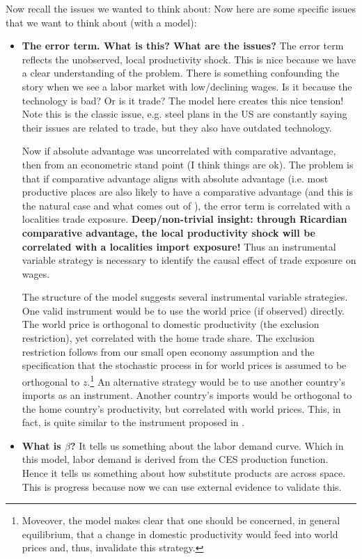 \documentclass[pdftex,12pt]{article}
\begin{document}
\medskip
\noindent Now recall the issues we wanted to think about:
Now here are some specific issues that we want to think about (with a model):
\begin{itemize}
\item \textbf{The error term. What is this? What are the issues?} The error term reflects the unobserved, local productivity shock. This is nice because we have a clear understanding of the problem. There is something confounding the story when we see a labor market with low/declining wages. Is it because the technology is bad? Or is it trade? The model here creates this nice tension! Note this is the classic issue, e.g. steel plans in the US are constantly saying their issues are related to trade, but they also have outdated technology. 
    
    Now if absolute advantage was uncorrelated with comparative advantage, then from an econometric stand point (I think things are ok). The problem is that if comparative advantage aligns with absolute advantage (i.e. most productive places are also likely to have a comparative advantage (and this is the natural case and what comes out of \citet{eaton2002technology}), the error term is correlated with a localities trade exposure. \textbf{Deep/non-trivial insight: through Ricardian comparative advantage, the local productivity shock will be correlated with a localities import exposure!}  Thus an instrumental variable strategy is necessary to identify the causal effect of trade exposure on wages.
    
    The structure of the model suggests several instrumental variable strategies. One valid instrument would be to use the world price (if observed) directly. The world price is orthogonal to domestic productivity (the exclusion restriction), yet correlated with the home trade share. The exclusion restriction follows from our small open economy assumption and the specification that the stochastic process in for world prices is assumed to be orthogonal to $z$.\footnote{Moveover, the model makes clear that one should be concerned, in general equilibrium, that a change in domestic productivity would feed into world prices and, thus, invalidate this strategy.} An alternative strategy would be to use another country's imports as an instrument. Another country's imports would be orthogonal to the home country's productivity, but correlated with world prices. This, in fact, is quite similar to the instrument proposed in \citet{david2013china}.
    
\item \textbf{What is $\beta$?} It tells us something about the labor demand curve. Which in this model, labor demand is derived from the CES production function. Hence it tells us something about how substitute products are across space. This is progress because now we can use external evidence to validate this. 
    

\end{itemize}
\end{document}
